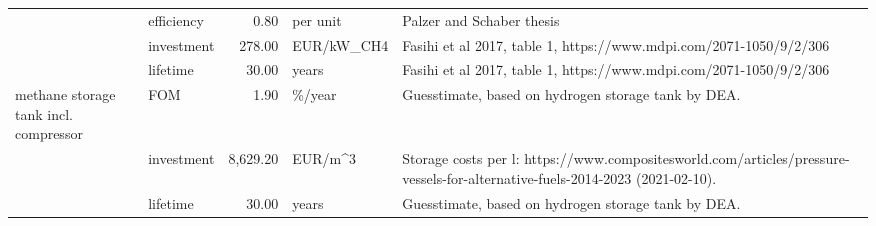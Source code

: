 \begin{longtable}{p{5cm}p{3cm}rp{3cm}p{11cm}}
                      & efficiency &           0.80 &                          per unit &                                                                                                                                                                                                                                                                                                            Palzer and Schaber thesis \\
                      & investment &         278.00 &                        EUR/kW\_CH4 &                                                                                                                                                                                                                                                                   Fasihi et al 2017, table 1, https://www.mdpi.com/2071-1050/9/2/306 \\
                      & lifetime &          30.00 &                             years &                                                                                                                                                                                                                                                                   Fasihi et al 2017, table 1, https://www.mdpi.com/2071-1050/9/2/306 \\
methane storage tank incl. compressor & FOM &           1.90 &                            \%/year &                                                                                                                                                                                                                                                                                  Guesstimate, based on hydrogen storage tank by DEA. \\
                      & investment &       8,629.20 &                           EUR/m\textasciicircum 3 &                                                                                                                                                                                                         Storage costs per l: https://www.compositesworld.com/articles/pressure-vessels-for-alternative-fuels-2014-2023 (2021-02-10). \\
                      & lifetime &          30.00 &                             years &                                                                                                                                                                                                                                                                                  Guesstimate, based on hydrogen storage tank by DEA. \\

\end{longtable}
